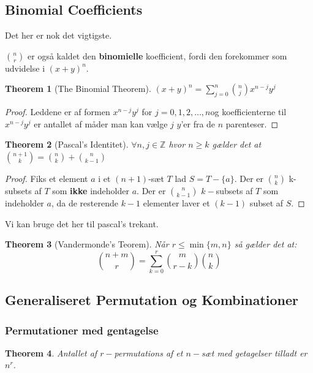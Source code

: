 \documentclass[11pt]{article}
\newtheorem{theorem}{Theorem}
\theoremstyle{definition}
\theoremstyle{remark}
\begin{document}
\subsection{Binomial Coefficients}

Det her er nok det vigtigste.

$\binom{n}{r}$ er også kaldet den \textbf{binomielle} koefficient, fordi den forekommer som udvidelse i $(x+y)^{n}$.

\begin{theorem}[The Binomial Theorem]
$(x+y)^{n} = \sum_{j=0}^{n} \binom{n}{j} x^{n-j}y^{j}$
\end{theorem}

\begin{proof}
Leddene er af formen $x^{n-j}y^{j}$ for $j = 0, 1, 2, \ldots, n$og koefficienterne til $x^{n-j}y^{j}$ er antallet af måder man kan vælge $j$ $y$'er fra de $n$ parenteser. 
\end{proof}


\begin{theorem}[Pascal's Identitet]
$\forall n, j \in \mathbb{Z}$ hvor $n \geq k$ gælder det at $\binom{n+1}{k} = \binom{n}{k} + \binom{n}{k-1}$
\end{theorem}


\begin{proof}
  Fiks et element $a$ i et $(n+1)$-sæt $T$ lad $S = T - \{a\}$.
  Der er $\binom{n}{k}$ k-subsets af $T$ som \textbf{ikke} indeholder $a$.
  Der er $\binom{n}{k-1}$ $k-$subsets af $T$ som indeholder $a$, da de resterende $k-1$ elementer laver et $(k-1)$ subset af $S$. 
\end{proof}

Vi kan bruge det her til pascal's trekant.

\begin{theorem}[Vandermonde's Teorem]
  Når $r \leq \min \{m,n\}$ så gælder det at:
  \[
\binom{n+m}{r} = \sum_{k=0}^{r} \binom{m}{r-k} \binom{n}{k}
  \]
  \end{theorem}


  \subsection{Generaliseret Permutation og Kombinationer}

  \subsubsection{Permutationer med gentagelse}
  

\begin{theorem}
Antallet af $r-$permutations af et $n-$sæt med getagelser tilladt er $n^{r}$.
\end{theorem}
\end{document}
